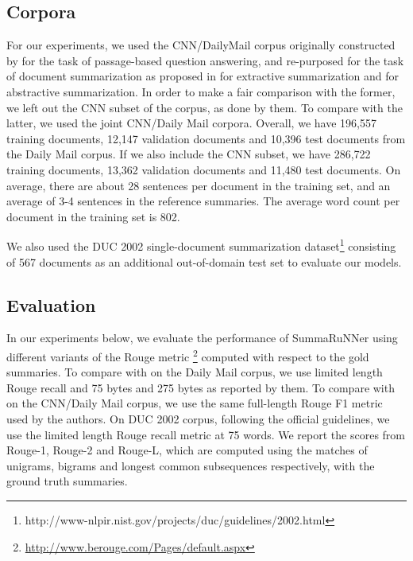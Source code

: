 \documentclass[letterpaper]{article}
\begin{document}
\subsection{Corpora} 
For our experiments, we used the CNN/DailyMail corpus originally constructed by \cite{reading_comprehension} for the task of passage-based question answering, and re-purposed for the task of document summarization as proposed in   \cite{jianpeng} for extractive summarization and \cite{nallapati_conll} for abstractive summarization. In order to make a fair comparison with the former, we left out the CNN subset of the corpus, as done by them. To compare with the latter, we used the joint CNN/Daily Mail corpora. Overall, we have 196,557 training documents, 12,147 validation documents and 10,396 test documents from the Daily Mail corpus. If we also include the CNN subset, we have 286,722 training documents, 13,362 validation documents and 11,480 test documents. On average, there are about 28 sentences per document in the training set, and an average of 3-4 sentences in the reference summaries. The average word count per document in the training set is 802.

We also used the DUC 2002 single-document summarization dataset\footnote{http://www-nlpir.nist.gov/projects/duc/guidelines/2002.html} consisting of 567 documents as an additional out-of-domain test set to evaluate our models.


\subsection{Evaluation} 
In our experiments below, we evaluate the performance of SummaRuNNer using different variants of the Rouge metric \footnote{{\small\url{ http://www.berouge.com/Pages/default.aspx}}} computed with respect to the gold summaries. To compare with \cite{jianpeng} on the Daily Mail corpus, we use limited length Rouge recall and 75 bytes and 275 bytes as reported by them. To compare with \cite{nallapati_conll} on the CNN/Daily Mail corpus, we use the same full-length Rouge F1 metric used by the authors. On DUC 2002 corpus, following the official guidelines, we use the limited length Rouge recall metric at  75 words. We report the scores from Rouge-1, Rouge-2 and Rouge-L, which are computed using the matches of unigrams, bigrams and longest common subsequences respectively, with the ground truth summaries.
\end{document}
